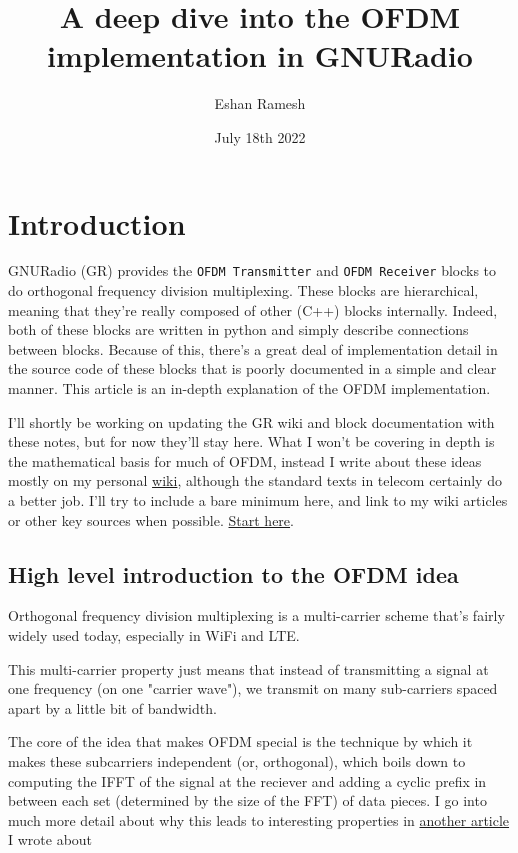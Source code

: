 \documentclass[11pt]{article}
\author{Eshan Ramesh}
\date{July 18th 2022}
\title{A deep dive into the OFDM implementation in GNURadio}
\begin{document}
\maketitle
\tableofcontents


\section{Introduction}
\label{sec:org9bfc007}
GNURadio (GR) provides the \texttt{OFDM Transmitter} and \texttt{OFDM Receiver}
blocks to do orthogonal frequency division multiplexing. These blocks
are hierarchical, meaning that they're really composed of other (C++)
blocks internally. Indeed, both of these blocks are written in python
and simply describe connections between blocks. Because of this, there's a
great deal of implementation detail in the source code of these blocks
that is poorly documented in a simple and clear manner. This article
is an in-depth explanation of the OFDM implementation.

I'll shortly be working on updating the GR wiki and block
documentation with these notes, but for now they'll stay here. What I
won't be covering in depth is the mathematical basis for much of OFDM,
instead I write about these ideas mostly on my personal \href{https://notes.esrh.me/}{wiki}, although
the standard texts in telecom certainly do a better job. I'll try to
include a bare minimum here, and link to my wiki articles or other key
sources when possible. \href{https://notes.esrh.me/orthogonal\_frequency\_division\_multiplexing.html}{Start here}.

\subsection{High level introduction to the OFDM idea}
\label{sec:org5ceec2c}
Orthogonal frequency division multiplexing is a multi-carrier scheme
that's fairly widely used today, especially in WiFi and LTE.

This multi-carrier property just means that instead of transmitting a
signal at one frequency (on one "carrier wave"), we transmit on many
sub-carriers spaced apart by a little bit of bandwidth.

The core of the idea that makes OFDM special is the technique by which
it makes these subcarriers independent (or, orthogonal), which boils
down to computing the IFFT of the signal at the reciever and adding a
cyclic prefix in between each set (determined by the size of the FFT)
of data pieces. I go into much more detail about why this leads to
interesting properties in \href{https://notes.esrh.me/orthogonal\_frequency\_division\_multiplexing.html}{another article} I wrote about
\end{document}
